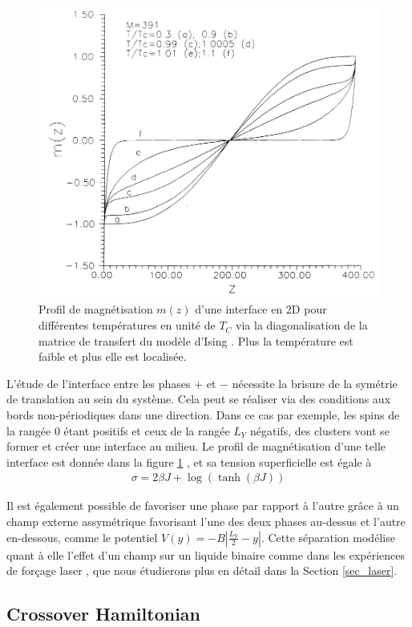 \begin{figure}
    \centering
    \includegraphics[width=0.5\linewidth]{isingtosos/stecki-profil.png}
    \caption{Profil de magnétisation $m(z)$ d'une interface en 2D pour différentes températures en unité de $T_C$ via la diagonalisation de la matrice de transfert du modèle d'Ising \cite{stecki_magnetization_1994}. Plus la température est faible  et plus elle est localisée.}
    \label{interface-ising}
\end{figure}

L'étude de l'interface entre les phases $+$ et $-$ nécessite la brisure de la symétrie de translation au sein du système. Cela peut se réaliser via des conditions aux bords non-périodiques dans une direction.
Dans ce cas par exemple, les spins de la rangée $0$ étant positifs et ceux de la rangée $L_Y$ négatifs, des clusters vont se former et créer une interface au milieu. 
Le profil de magnétisation d'une telle interface est donnée dans la figure \ref{interface-ising} \cite{stecki_magnetization_1994}, et sa tension superficielle est égale à \cite{abraham_transfer_1973,abraham_interface_1976,richards_numerical_1993} 
\begin{align}
    \sigma = 2 \beta J + \log(\tanh(\beta J))
\end{align}

Il est également possible de favoriser une phase par rapport à l'autre grâce à un champ externe assymétrique favorisant l'une des deux phases au-dessus et l'autre en-dessous, comme le potentiel $V(y) = - B |\frac{L_Y}{2}-y|$. Cette séparation modélise quant à elle l'effet d'un champ  sur un liquide binaire comme dans les expériences de forçage laser \cite{girot_conical_2019}, que nous étudierons plus en détail dans la Section \ref{sec_laser}.


\subsection{Crossover Hamiltonian}


